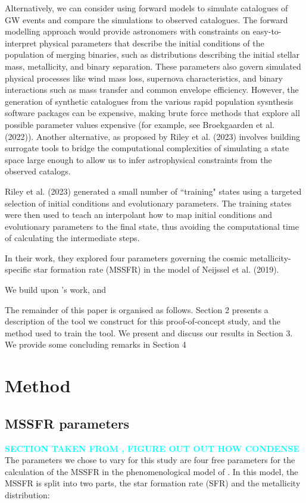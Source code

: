 \documentclass[twocolumn]{aastex631}
\newcommand{\avi}[1]{\textbf{\textcolor{cyan}{#1}}}
\begin{document}
Alternatively, we can consider using forward models to simulate catalogues of GW events and compare the simulations to observed catalogues.
The forward modelling approach would provide astronomers with constraints on easy-to-interpret physical parameters that describe the initial conditions of the population of merging binaries, such as distributions describing the initial stellar mass, metallicity, and binary separation.
These parameters also govern simulated physical processes like wind mass loss, supernova characteristics, and binary interactions such as mass transfer and common envelope efficiency.
However, the generation of synthetic catalogues from the various rapid population sysnthesis software packages can be expensive, making brute force methods that explore all possible parameter values expensive (for example, see  Broekgaarden et al. (2022)).
Another alternative, as proposed by Riley et al. (2023) involves building surrogate tools to bridge the computational complexities of simulating a state space large enough
to allow us to infer astrophysical constraints from the observed catalogs.

Riley et al. (2023) generated a small number of ``training" states using a
targeted selection of initial conditions and evolutionary
parameters.
The training states were then used to teach an interpolant how to
map initial conditions and evolutionary parameters to
the final state, thus avoiding the computational time
of calculating the intermediate steps.

In their work, they explored four parameters governing the cosmic metallicity-specific star formation rate (MSSFR) in the model of Neijssel et al. (2019).

We build upon \citep{Riley:2023:ApJ}'s work, and

The remainder of this paper is organised as follows.
Section 2 presents a description of the tool we construct
for this proof-of-concept study, and the method used
to train the tool.
We present and discuss our results in Section 3.
We provide some concluding remarks in  Section 4



\section{Method}


\subsection{MSSFR parameters}\label{sec:method_parameters}
\avi{SECTION TAKEN FROM \citep{Riley:2023:ApJ}, FIGURE OUT OUT HOW CONDENSE}
The parameters we chose to vary for this study are four free parameters for the calculation of the \ac{MSSFR} in the phenomenological model of \citet{Neijssel_2019}. In this model, the \ac{MSSFR} is split into two parts, the star formation rate (SFR) and the metallicity distribution:
\end{document}
